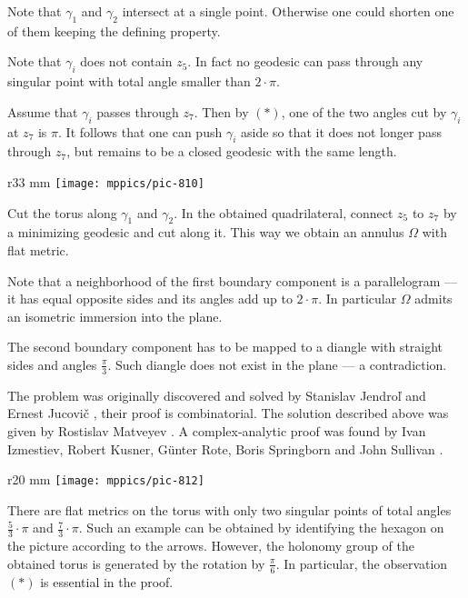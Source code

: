 Note that $\gamma_1$ and $\gamma_2$ intersect at a single point.
Otherwise one could shorten one of them keeping the defining property.

Note that $\gamma_i$ does not contain $z_5$.
In fact no geodesic can pass through any singular point with total angle smaller than $2\cdot\pi$.


Assume that $\gamma_i$ passes through $z_7$.
Then by $({*})$, one of the two angles cut by $\gamma_i$ at $z_7$ is $\pi$.
It follows that one can push $\gamma_i$ aside so that it does not longer pass through $z_7$, but remains to be a closed geodesic with the same length.

\begin{wrapfigure}{r}{33 mm}
\vskip0mm
\centering
\texttt{[image: mppics/pic-810]}
\end{wrapfigure}

Cut the torus along $\gamma_1$ and $\gamma_2$.
In the obtained quadrilateral, connect $z_5$ to $z_7$ by a minimizing geodesic and cut along it.
This way we obtain an annulus $\Omega$ with flat metric.

Note that a neighborhood of the first boundary component is a parallelogram --- it has equal opposite sides and its angles add up to $2\cdot \pi$.
In particular $\Omega$ admits an isometric immersion into the plane.

The second boundary component has to be mapped to a diangle with straight sides and angles $\tfrac\pi3$.
Such diangle does not exist in the plane --- a contradiction.
\qeds

The problem was originally discovered and solved by {\selectfont Stanislav Jendro\v{l}}
and Ernest Jucovi\v{c} \cite{jendrol-jucovich},
their proof is combinatorial.
The solution described above was given by Rostislav Matveyev \cite{matveyev}.
A complex-analytic proof was found by 
Ivan Izmestiev, 
Robert Kusner, 
G\"unter Rote, 
Boris Springborn 
and John Sullivan \cite{izmestiev-rote-springborn-kusner}.

\begin{wrapfigure}{r}{20 mm}
\vskip0mm
\centering
\texttt{[image: mppics/pic-812]}
\end{wrapfigure}

There are flat metrics on the torus with 
only two singular points of total angles $\tfrac53\cdot\pi$ and $\tfrac73\cdot\pi$.
Such an example can be obtained by identifying the hexagon on the picture  according to the arrows.
However, the holonomy group of the obtained torus is generated by the rotation by $\tfrac\pi6$. 
In particular, the observation $({*})$ is essential in the proof.

